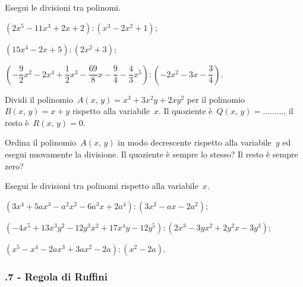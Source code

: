 \begin{esercizio}
\label{ese:11.28}
Esegui le divisioni tra polinomi.
 \begin{enumeratea}
 \item $\left(2x^{5}-11x^{3}+2x+2\right):\left(x^{3}-2x^{2}+1\right)$;
 \item $\left(15x^{4}-2x+5\right):\left(2x^{2}+3\right)$;
 \item $\left(-{\dfrac{9}{2}}x^{2}-2x^{4}+\dfrac{1}{2}x^{3}-\dfrac{69}{8}x-\dfrac{9}{4}-\dfrac{4}{3}x^{5}\right):\left(-2x^{2}-3x-\dfrac{3}{4}\right)$.
 \end{enumeratea}
\end{esercizio}


\begin{esercizio}
\label{ese:11.29}
Dividi il polinomio~$A(x\text{,~}y)=x^{3}+3x^{2}y+2xy^{2}$ per il polinomio~$B(x\text{,~}y)=x+y$ rispetto alla variabile~$x$.
Il quoziente è~$Q(x\text{,~}y)=\ldots \ldots \ldots$, il resto è~$R(x\text{,~}y)=0$.

Ordina il polinomio~$A(x\text{,~}y)$ in modo decrescente rispetto alla variabile~$y$ ed esegui
nuovamente la divisione. Il quoziente è sempre lo stesso? Il resto è sempre zero?
\end{esercizio}

\begin{esercizio}
\label{ese:11.30}
Esegui le divisioni tra polinomi rispetto alla variabile~$x$.
 \begin{enumeratea}
 \item $\left(3x^{4}+5ax^{3}-a^{2}x^{2}-6a^{3}x+2a^{4}\right):\left(3x^{2}-ax-2a^{2}\right)$;
 \item $\left(-4x^{5}+13x^{3}y^{2}-12y^{3}x^{2}+17x^{4}y-12y^{5}\right):\left(2x^{3}-3yx^{2}+2y^{2}x-3y^{3}\right)$;
 \item $\left(x^{5}-x^{4}-2ax^{3}+3ax^{2}-2a\right):\left(x^{2}-2a\right)$.
 \end{enumeratea}
\end{esercizio}

\subsubsection*{\thechapter.7 - Regola di Ruffini}

